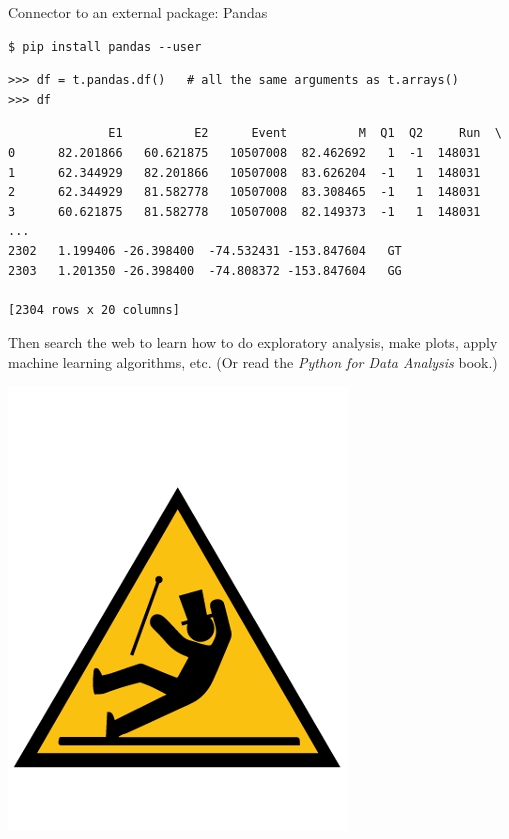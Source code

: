 \documentclass[aspectratio=169]{beamer}
\begin{document}
\begin{frame}[fragile]{Connector to an external package: Pandas}
\vspace{0.25 cm}
\small
\begin{verbatim}
$ pip install pandas --user
\end{verbatim}
\begin{verbatim}
>>> df = t.pandas.df()   # all the same arguments as t.arrays()
>>> df
\end{verbatim}
\begin{verbatim}
              E1          E2      Event          M  Q1  Q2     Run  \
0      82.201866   60.621875   10507008  82.462692   1  -1  148031
1      62.344929   82.201866   10507008  83.626204  -1   1  148031
2      62.344929   81.582778   10507008  83.308465  -1   1  148031
3      60.621875   81.582778   10507008  82.149373  -1   1  148031
...
2302   1.199406 -26.398400  -74.532431 -153.847604   GT
2303   1.201350 -26.398400  -74.808372 -153.847604   GG

[2304 rows x 20 columns]
\end{verbatim}

\vspace{0.25 cm}
Then search the web to learn how to do exploratory analysis, make plots, apply machine learning algorithms, etc. (Or read the {\it Python for Data Analysis} book.)

\vspace{-3 cm}
\hfill \includegraphics[width=1.5 cm]{caution.png}\hspace{-0.9 cm}
\vspace{3 cm}
\end{frame}
\end{document}
